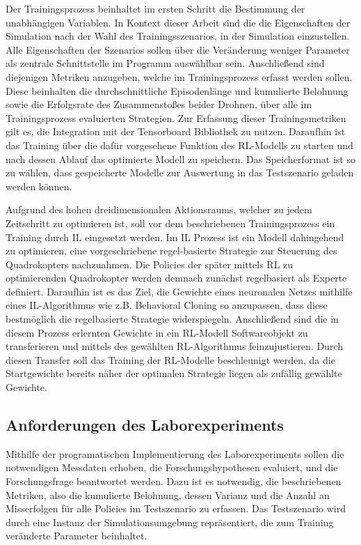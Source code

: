 Der Trainingsprozess beinhaltet im ersten Schritt die Bestimmung der unabhängigen Variablen. 
In Kontext dieser Arbeit sind die die Eigenschaften der Simulation nach der Wahl des Trainingsszenarios, in der Simulation einzustellen.
Alle Eigenschaften der Szenarios sollen über die Veränderung weniger Parameter als zentrale Schnittstelle im Programm auswählbar sein.
Anschließend sind diejenigen Metriken anzugeben, welche im Trainingsprozess erfasst werden sollen.
Diese beinhalten die durchschnittliche Episodenlänge und kumulierte Belohnung sowie die Erfolgsrate des Zusammenstoßes beider Drohnen, über alle im Trainingsprozess evaluierten Strategien.
Zur Erfassung dieser Trainingsmetriken gilt es, die Integration mit der Tensorboard Bibliothek zu nutzen.
Daraufhin ist das Training über die dafür vorgesehene Funktion des RL-Modells zu starten und nach dessen Ablauf das optimierte Modell zu speichern.
Das Speicherformat ist so zu wählen, dass gespeicherte Modelle zur Auswertung in das Testszenario geladen werden können.

Aufgrund des hohen dreidimensionalen Aktionsraums, welcher zu jedem Zeitschritt zu optimieren ist, soll vor dem beschriebenen Trainingsprozess ein Training durch IL eingesetzt werden.
Im IL Prozess ist ein Modell dahingehend zu optimieren, eine vorgeschriebene regel-basierte Strategie zur Steuerung des Quadrokopters nachzuahmen. 
Die Policies der später mittels RL zu optimierenden Quadrokopter werden demnach zunächst regelbasiert als Experte definiert. 
Daraufhin ist es das Ziel, die Gewichte eines neuronalen Netzes mithilfe eines IL-Algorithmus wie z.B. Behavioral Cloning so anzupassen, dass diese bestmöglich die regelbasierte Strategie widerspiegeln.
Anschließend sind die in diesem Prozess erlernten Gewichte in ein RL-Modell Softwareobjekt zu transferieren und mittels des gewählten RL-Algorithmus feinzujustieren.
Durch diesen Transfer soll das Training der RL-Modelle beschleunigt werden, da die Startgewichte bereits näher der optimalen Strategie liegen als zufällig gewählte Gewichte.

\subsection{Anforderungen des Laborexperiments}

Mithilfe der programatischen Implementierung des Laborexperiments sollen die notwendigen Messdaten erhoben, die Forschungshypothesen evaluiert, und die Forschungsfrage beantwortet werden.
Dazu ist es notwendig, die beschriebenen Metriken, also die kumulierte Belohnung, dessen Varianz und die Anzahl an Misserfolgen für alle Policies im Testszenario zu erfassen.
Das Testszenario wird durch eine Instanz der Simulationsumgebung repräsentiert, die zum Training veränderte Parameter beinhaltet.

